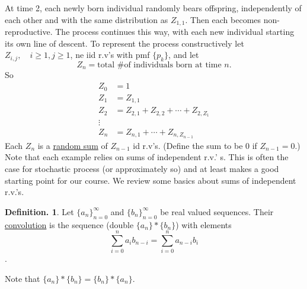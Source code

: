 \documentclass[12pt]{article}
\theoremstyle{definition}
\newtheorem{mydef}{Definition.}[section]
\theoremstyle{plain}
\begin{document}
At time 2, each newly born individual randomly bears offspring, independently of each other and with the same distribution as $Z_{1,1}$. Then each becomes non-reproductive. The process continues this way, with each new individual starting its own line of descent.
To represent the process constructively let $Z_{i,j}, \quad i \geq 1, j\geq 1$, ne iid r.v's with pmf $\{p_k\}$, and let \[Z_n = \mbox{total \# of individuals born at time $n$.}\] So
\begin{displaymath}
\begin{aligned}
Z_0 &= 1 \\
Z_1 &= Z_{1,1} \\
Z_2 &= Z_{2,1} + Z_{2,2} + \cdots + Z_{2, Z_1} \\
\vdots \\
Z_n &= Z_{n,1} + \cdots + Z_{n, Z_{n-1}}
\end{aligned}
\end{displaymath}
Each $Z_n$ is a \underline{random sum} of $Z_{n-1}$ id r.v's. (Define the sum to be $0$ if $Z_{n-1} = 0$.)
Note that each example relies on sums of independent r.v.' s. This is often the case for stochastic process (or approximately so) and at least makes a good starting point for our course. We review some basics about sums of independent r.v.'s.
\begin{mydef}
Let $\{a_n\}_{n=0}^\infty$ and $\{b_n\}_{n=0}^\infty$ be real valued sequences. Their \underline{convolution} is the sequence (double $\{a_n\} * \{b_n\}$) with elements \[\sum_{i=0}^n a_i b_{n-i}  = \sum_{i=0}^n a_{n-i}b_i\].
\end{mydef}
Note that $\{a_n\}*\{b_n\} = \{b_n\}*\{a_n\}$.
\end{document}
